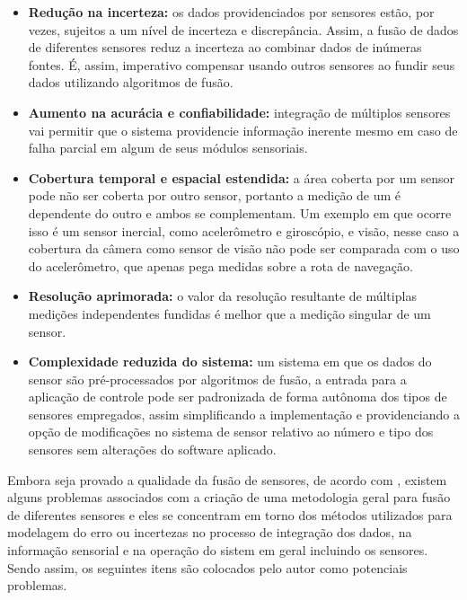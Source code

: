 \documentclass[acronym, symbols]{fei}
\begin{document}
			\begin{itemize}
				
				\item \textbf{Redução na incerteza:} os dados providenciados por sensores estão, por vezes, sujeitos a um nível de incerteza e discrepância. Assim, a fusão de dados de diferentes sensores reduz a incerteza ao combinar dados de inúmeras fontes. É, assim, imperativo compensar usando outros sensores ao fundir seus dados utilizando algoritmos de fusão.
				
				\item \textbf{Aumento na acurácia e confiabilidade:} integração de múltiplos sensores vai permitir que o sistema providencie informação inerente mesmo em caso de falha parcial em algum de seus módulos sensoriais.
				
				\item \textbf{Cobertura temporal e espacial estendida:} a área coberta por um sensor pode não ser coberta por outro sensor, portanto a medição de um é dependente do outro e ambos se complementam. Um exemplo em que ocorre isso é um sensor inercial, como acelerômetro e giroscópio, e visão, nesse caso a cobertura da câmera como sensor de visão não pode ser comparada com o uso do acelerômetro, que apenas pega medidas sobre a rota de navegação.
				
				\item \textbf{Resolução aprimorada:} o valor da resolução resultante de múltiplas medições independentes fundidas é melhor que a medição singular de um sensor.
				
				\item \textbf{Complexidade reduzida do sistema:} um sistema em que os dados do sensor são pré-processados por algoritmos de fusão, a entrada para a aplicação de controle pode ser padronizada de forma autônoma dos tipos de sensores empregados, assim simplificando a implementação e providenciando a opção de modificações no sistema de sensor relativo ao número e tipo dos sensores sem alterações do software aplicado.
				
			\end{itemize}
		
			Embora seja provado a qualidade da fusão de sensores, de acordo com \textcite{fung2017sensor}, existem alguns problemas associados com a criação de uma metodologia geral para fusão de diferentes sensores e eles se concentram em torno dos métodos utilizados para modelagem do erro ou incertezas no processo de integração dos dados, na informação sensorial e na operação do sistem em geral incluindo os sensores. Sendo assim, os seguintes itens são colocados pelo autor como potenciais problemas.
			
\end{document}
